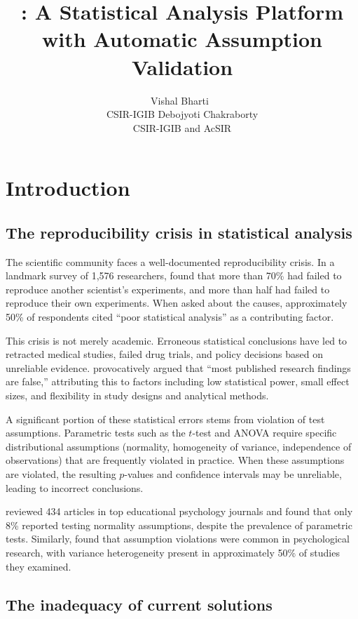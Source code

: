 \documentclass[article]{jss}
\author{
  Vishal Bharti~\orcidicon{0009-0003-1431-4457}\\CSIR-IGIB
  \And
  Debojyoti Chakraborty\\CSIR-IGIB and AcSIR
}
\title{\pkg{StickForStats}: A Statistical Analysis Platform with Automatic Assumption Validation}
\begin{document}

\section{Introduction} \label{sec:intro}

\subsection{The reproducibility crisis in statistical analysis}

The scientific community faces a well-documented reproducibility crisis. In a landmark survey of 1,576 researchers, \citet{baker2016reproducibility} found that more than 70\% had failed to reproduce another scientist's experiments, and more than half had failed to reproduce their own experiments. When asked about the causes, approximately 50\% of respondents cited ``poor statistical analysis'' as a contributing factor.

This crisis is not merely academic. Erroneous statistical conclusions have led to retracted medical studies, failed drug trials, and policy decisions based on unreliable evidence. \citet{ioannidis2005why} provocatively argued that ``most published research findings are false,'' attributing this to factors including low statistical power, small effect sizes, and flexibility in study designs and analytical methods.

A significant portion of these statistical errors stems from violation of test assumptions. Parametric tests such as the $t$-test and ANOVA require specific distributional assumptions (normality, homogeneity of variance, independence of observations) that are frequently violated in practice. When these assumptions are violated, the resulting $p$-values and confidence intervals may be unreliable, leading to incorrect conclusions.

\citet{osborne2010improving} reviewed 434 articles in top educational psychology journals and found that only 8\% reported testing normality assumptions, despite the prevalence of parametric tests. Similarly, \citet{keselman1998statistical} found that assumption violations were common in psychological research, with variance heterogeneity present in approximately 50\% of studies they examined.

\subsection{The inadequacy of current solutions}
\end{document}
